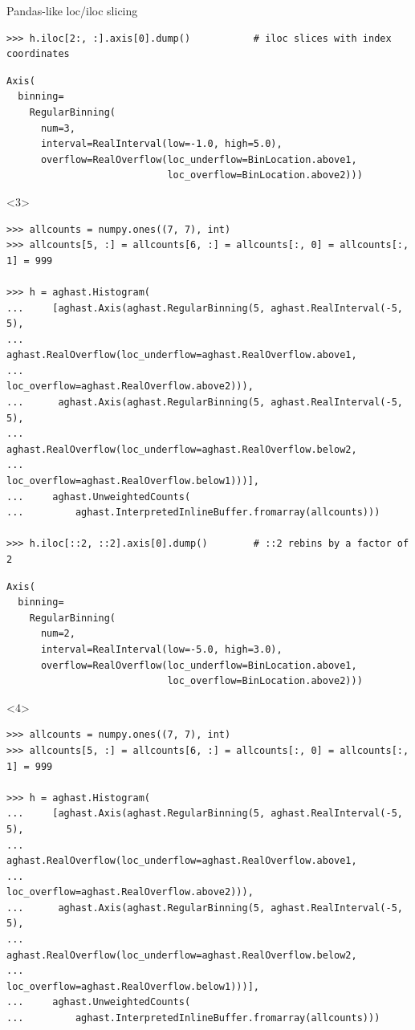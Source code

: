 \documentclass[aspectratio=169]{beamer}
\begin{document}
\begin{frame}[fragile]{Pandas-like loc/iloc slicing}
\begin{onlyenv}
\begin{verbatim}
>>> h.iloc[2:, :].axis[0].dump()           # iloc slices with index coordinates
\end{verbatim}
\begin{verbatim}
Axis(
  binning=
    RegularBinning(
      num=3,
      interval=RealInterval(low=-1.0, high=5.0),
      overflow=RealOverflow(loc_underflow=BinLocation.above1,
                            loc_overflow=BinLocation.above2)))
\end{verbatim}
\end{onlyenv}
\begin{onlyenv}<3>
\begin{verbatim}
>>> allcounts = numpy.ones((7, 7), int)
>>> allcounts[5, :] = allcounts[6, :] = allcounts[:, 0] = allcounts[:, 1] = 999

>>> h = aghast.Histogram(
...     [aghast.Axis(aghast.RegularBinning(5, aghast.RealInterval(-5, 5),
...                  aghast.RealOverflow(loc_underflow=aghast.RealOverflow.above1,
...                                      loc_overflow=aghast.RealOverflow.above2))),
...      aghast.Axis(aghast.RegularBinning(5, aghast.RealInterval(-5, 5),
...                  aghast.RealOverflow(loc_underflow=aghast.RealOverflow.below2,
...                                      loc_overflow=aghast.RealOverflow.below1)))],
...     aghast.UnweightedCounts(
...         aghast.InterpretedInlineBuffer.fromarray(allcounts)))

>>> h.iloc[::2, ::2].axis[0].dump()        # ::2 rebins by a factor of 2
\end{verbatim}
\begin{verbatim}
Axis(
  binning=
    RegularBinning(
      num=2,
      interval=RealInterval(low=-5.0, high=3.0),
      overflow=RealOverflow(loc_underflow=BinLocation.above1,
                            loc_overflow=BinLocation.above2)))
\end{verbatim}
\end{onlyenv}
\begin{onlyenv}<4>
\begin{verbatim}
>>> allcounts = numpy.ones((7, 7), int)
>>> allcounts[5, :] = allcounts[6, :] = allcounts[:, 0] = allcounts[:, 1] = 999

>>> h = aghast.Histogram(
...     [aghast.Axis(aghast.RegularBinning(5, aghast.RealInterval(-5, 5),
...                  aghast.RealOverflow(loc_underflow=aghast.RealOverflow.above1,
...                                      loc_overflow=aghast.RealOverflow.above2))),
...      aghast.Axis(aghast.RegularBinning(5, aghast.RealInterval(-5, 5),
...                  aghast.RealOverflow(loc_underflow=aghast.RealOverflow.below2,
...                                      loc_overflow=aghast.RealOverflow.below1)))],
...     aghast.UnweightedCounts(
...         aghast.InterpretedInlineBuffer.fromarray(allcounts)))


\end{verbatim}
\end{onlyenv}
\end{frame}
\end{document}
